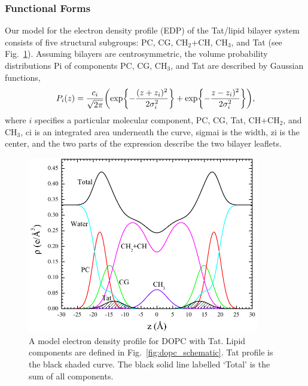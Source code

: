 \subsubsection{Functional Forms}
Our model for the electron density profile (\acs{EDP})
of the Tat/lipid bilayer system consists of five structural subgroups: PC, CG,
CH$_2$+CH, CH$_3$, and Tat (see Fig.~\ref{fig:DOPC_EDP}).
Assuming bilayers are centrosymmetric, 
the volume probability distributions \gls{Pi} of components PC, CG, CH$_3$, and Tat 
are described by Gaussian functions,
\begin{equation}
  P_i(z)=\frac{c_i}{\sqrt{2\pi}}\mathopen{}\left( 
    \exp\mathopen{}\left\lbrace -\frac{(z+z_i)^2}{2\sigma_i^2} \right\rbrace\mathclose{}
	+ \exp\mathopen{}\left\lbrace -\frac{z-z_i)^2}{2\sigma_i^2} \right\rbrace\mathclose{}
   \right)\mathclose{},
\end{equation}
where $i$ specifies a particular molecular component,
PC, CG, Tat, CH+CH$_2$, and CH$_3$,
\gls{ci} is an integrated area underneath the curve,
\gls{sigmai} is the width, \gls{zi} is the center,
and the two parts of the 
expression describe the two bilayer leaflets. 

\begin{figure}[htbp]
  \centering
  \includegraphics[width=0.9\textwidth]{figures/Tat/SDP_Results/EDP/DOPC_Tat_model_EDP}
  \caption[A model electron density profile for DOPC with Tat]
  {A model electron density profile for DOPC with Tat. Lipid components
  are defined in Fig.~\ref{fig:dopc_schematic}. Tat profile is the black shaded
  curve. The black solid line labelled `Total' is the sum of all components.}
  \label{fig:DOPC_EDP}
\end{figure}

